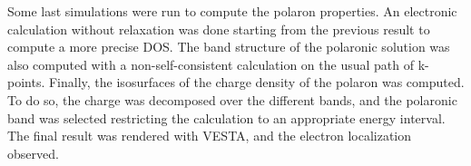 Some last simulations were run to compute the polaron properties. An electronic calculation without relaxation was done starting from the previous result to compute a more precise DOS. The band structure of the polaronic solution was also computed with a non-self-consistent calculation on the usual path of k-points. Finally, the isosurfaces of the charge density of the polaron was computed. To do so, the charge was decomposed over the different bands, and the polaronic band was selected restricting the calculation to an appropriate energy interval. The final result was rendered with VESTA, and the electron localization observed.